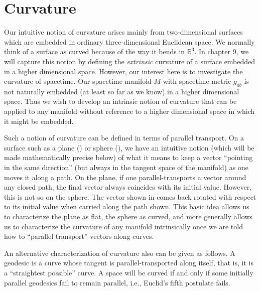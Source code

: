 \chapter{Curvature}
Our intuitive notion of curvature arises mainly from two-dimensional surfaces which are embedded in ordinary three-dimensional Euclidean space. We normally think of a surface as curved because of the way it bends in $\mathbb{R}^3$. In chapter 9, we will capture this notion by defining the \emph{extrinsic} curvature of a surface embedded in a higher dimensional space. However, our interest here is to investigate the curvature of spacetime. Our spacetime manifold $M$ with spacetime metric $g_{ab}$ is not naturally embedded (at least so far as we know) in a higher dimensional space. Thus we wish to develop an intrinsic notion of curvature that can be applied to any manifold without reference to a higher dimensional space in which it might be embedded.

Such a notion of curvature can be defined in terms of parallel transport. On a surface such as a plane () or sphere (), we have an intuitive notion (which will be made mathematically precise below) of what it means to keep a vector ``pointing in the same direction'' (but always in the tangent space of the manifold) as one moves it along a path. On the plane, if one parallel-transports a vector around any closed path, the final vector always coincides with its initial value. However, this is not so on the sphere. The vector shown in  comes back rotated with respect to its initial value when carried along the path shown. This basic idea allows us to characterize the plane as flat, the sphere as curved, and more generally allows us to characterize the curvature of any manifold intrinsically once we are told how to ``parallel transport'' vectors along curves. 

An alternative characterization of curvature also can be given as follows. A geodesic is a curve whose tangent is parallel-transported along itself, that is, it is a ``straightest possible'' curve. A space will be curved if and only if some initially parallel geodesics fail to remain parallel, i.e., Euclid's fifth postulate fails.

